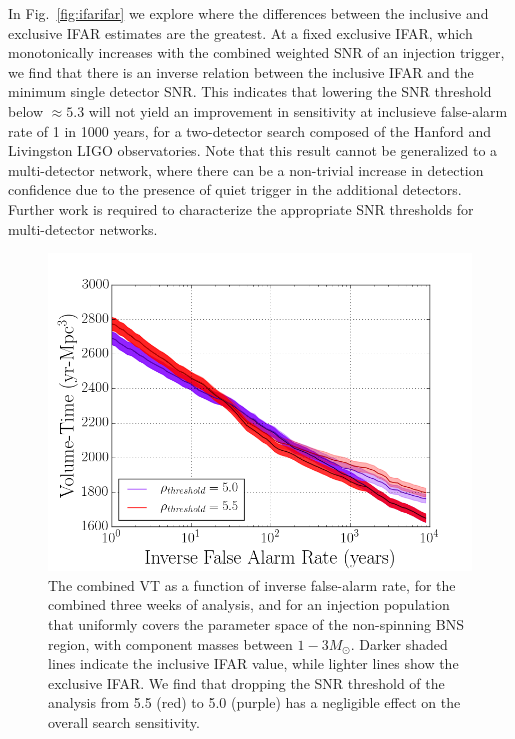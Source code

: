 In Fig.~\ref{fig:ifarifar} we explore where the differences between the inclusive and exclusive IFAR estimates are the greatest. At a fixed exclusive IFAR, which monotonically increases with the combined weighted SNR of an injection trigger, we find that there is an inverse relation between the inclusive IFAR and the minimum single detector SNR. This indicates that lowering the SNR threshold below $\approx 5.3$ will not yield an improvement in sensitivity at inclusieve false-alarm rate of 1 in 1000 years, for a two-detector search composed of the Hanford and Livingston LIGO observatories. Note that this result cannot be generalized to a multi-detector network, where there can be a non-trivial increase in detection confidence due to the presence of quiet trigger in the additional detectors. Further work is required to characterize the appropriate SNR thresholds for multi-detector networks.



\begin{figure}
\centering
\includegraphics[width=1.0\textwidth]{papers/bns_o1_dev/figures/snr_combined.png}
\caption{\label{fig:snrthreshold} 
The combined VT as a function of inverse false-alarm rate, for the combined three weeks of analysis, and for an injection population that uniformly covers the parameter space of the non-spinning BNS region, with component masses between $1- 3M_\odot$. Darker shaded lines indicate the inclusive IFAR value, while lighter lines show the exclusive IFAR. We find that dropping the SNR threshold of the analysis from 5.5 (red) to 5.0 (purple) has a negligible effect on the overall search sensitivity.
}
\end{figure}

